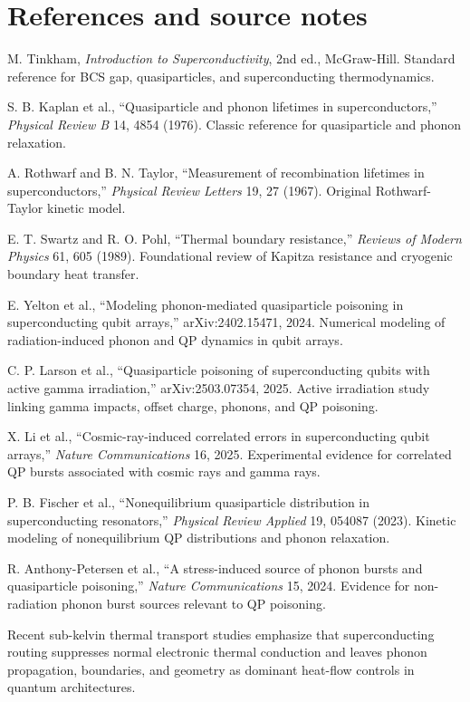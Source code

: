 \documentclass[11pt]{article}
\begin{document}
\section*{References and source notes}

\begin{enumerate}[label={[\arabic*]}]
\item M. Tinkham, \textit{Introduction to Superconductivity}, 2nd ed., McGraw-Hill. Standard reference for BCS gap, quasiparticles, and superconducting thermodynamics.
\item S. B. Kaplan et al., ``Quasiparticle and phonon lifetimes in superconductors,'' \textit{Physical Review B} 14, 4854 (1976). Classic reference for quasiparticle and phonon relaxation.
\item A. Rothwarf and B. N. Taylor, ``Measurement of recombination lifetimes in superconductors,'' \textit{Physical Review Letters} 19, 27 (1967). Original Rothwarf-Taylor kinetic model.
\item E. T. Swartz and R. O. Pohl, ``Thermal boundary resistance,'' \textit{Reviews of Modern Physics} 61, 605 (1989). Foundational review of Kapitza resistance and cryogenic boundary heat transfer.
\item E. Yelton et al., ``Modeling phonon-mediated quasiparticle poisoning in superconducting qubit arrays,'' arXiv:2402.15471, 2024. Numerical modeling of radiation-induced phonon and QP dynamics in qubit arrays.
\item C. P. Larson et al., ``Quasiparticle poisoning of superconducting qubits with active gamma irradiation,'' arXiv:2503.07354, 2025. Active irradiation study linking gamma impacts, offset charge, phonons, and QP poisoning.
\item X. Li et al., ``Cosmic-ray-induced correlated errors in superconducting qubit arrays,'' \textit{Nature Communications} 16, 2025. Experimental evidence for correlated QP bursts associated with cosmic rays and gamma rays.
\item P. B. Fischer et al., ``Nonequilibrium quasiparticle distribution in superconducting resonators,'' \textit{Physical Review Applied} 19, 054087 (2023). Kinetic modeling of nonequilibrium QP distributions and phonon relaxation.
\item R. Anthony-Petersen et al., ``A stress-induced source of phonon bursts and quasiparticle poisoning,'' \textit{Nature Communications} 15, 2024. Evidence for non-radiation phonon burst sources relevant to QP poisoning.
\item Recent sub-kelvin thermal transport studies emphasize that superconducting routing suppresses normal electronic thermal conduction and leaves phonon propagation, boundaries, and geometry as dominant heat-flow controls in quantum architectures.
\end{enumerate}
\end{document}

